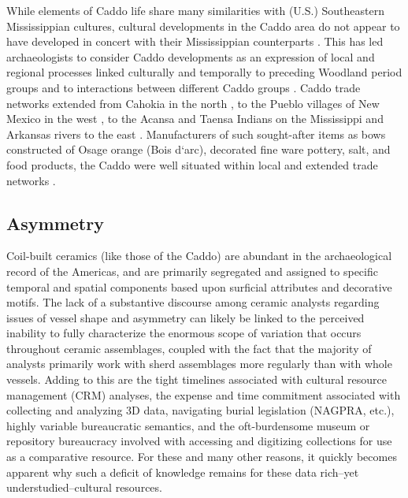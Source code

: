 \documentclass[preprint,12pt]{elsarticle}
\begin{document}
While elements of Caddo life share many similarities with (U.S.) Southeastern Mississippian cultures, cultural developments in the Caddo area do not appear to have developed in concert with their Mississippian counterparts \citep{Blitz:1, Livingood:1}. This has led archaeologists to consider Caddo developments as an expression of local and regional processes linked culturally and temporally to preceding Woodland period groups and to interactions between different Caddo groups \citep{Perttula:4, Perttula:2}. Caddo trade networks extended from Cahokia in the north \citep{Smith:1, Foster:1}, to the Pueblo villages of New Mexico in the west \citep{Smith:1}, to the Acansa and Taensa Indians on the Mississippi and Arkansas rivers to the east \citep{Foster:1}. Manufacturers of such sought-after items as bows constructed of Osage orange (Bois d`arc), decorated fine ware pottery, salt, and food products, the Caddo were well situated within local and extended trade networks \citep{LaVere:1, Perttula:5, Smith:1, Swanton:1}.

\subsection{Asymmetry}

Coil-built ceramics (like those of the Caddo) are abundant in the archaeological record of the Americas, and are primarily segregated and assigned to specific temporal and spatial components based upon surficial attributes and decorative motifs. The lack of a substantive discourse among ceramic analysts regarding issues of vessel shape and asymmetry can likely be linked to the perceived inability to fully characterize the enormous scope of variation that occurs throughout ceramic assemblages, coupled with the fact that the majority of analysts primarily work with sherd assemblages more regularly than with whole vessels. Adding to this are the tight timelines associated with cultural resource management (CRM) analyses, the expense and time commitment associated with collecting and analyzing 3D data, navigating burial legislation (NAGPRA, etc.), highly variable bureaucratic semantics, and the oft-burdensome museum or repository bureaucracy involved with accessing and digitizing collections for use as a comparative resource. For these and many other reasons, it quickly becomes apparent why such a deficit of knowledge remains for these data rich--yet understudied--cultural resources. 
\end{document}
